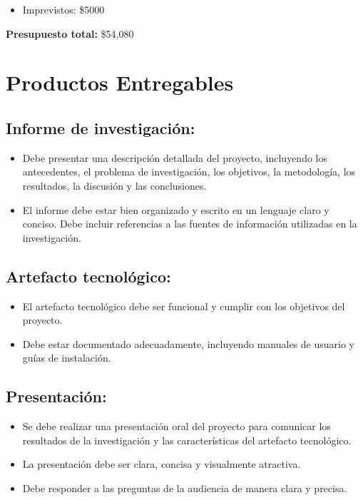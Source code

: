 \documentclass{article}
\begin{document}
\begin{itemize}
  \item Imprevistos: \$5000
\end{itemize}

\textbf{Presupuesto total:} \$54,080

\section{Productos Entregables}

\subsection{Informe de investigación:}
\begin{itemize}
  \item Debe presentar una descripción detallada del proyecto, incluyendo los antecedentes, el problema de investigación, los objetivos, la metodología, los resultados, la discusión y las conclusiones.
  \item El informe debe estar bien organizado y escrito en un lenguaje claro y conciso.
  Debe incluir referencias a las fuentes de información utilizadas en la investigación.
\end{itemize}

\subsection{Artefacto tecnológico:}

\begin{itemize}
  \item El artefacto tecnológico debe ser funcional y cumplir con los objetivos del proyecto.
  \item Debe estar documentado adecuadamente, incluyendo manuales de usuario y guías de instalación.
\end{itemize}

\subsection{Presentación:}
\begin{itemize}
  \item Se debe realizar una presentación oral del proyecto para comunicar los resultados de la investigación y las características del artefacto tecnológico.
  \item La presentación debe ser clara, concisa y visualmente atractiva.
  \item Debe responder a las preguntas de la audiencia de manera clara y precisa.
\end{itemize}
\end{document}
